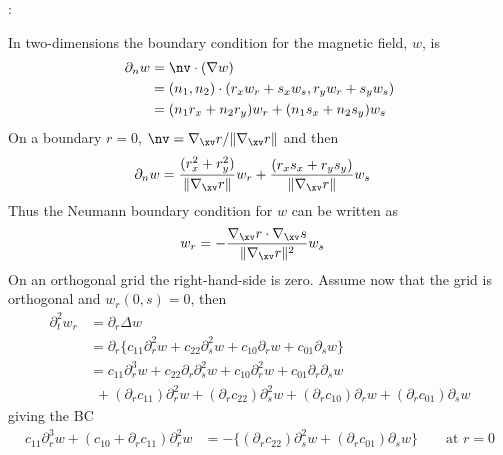 \documentclass[10pt]{article}
\newcommand{\grad}{\nabla}
\begin{document}
:

In two-dimensions the boundary condition for the magnetic field, $w$, is
\begin{align*}
    \partial_n w & = \nv\cdot(\grad w) \\
                 & = (n_1,n_2)\cdot(r_x w_r + s_x w_s, r_y w_r + s_y w_s ) \\
                 & = (n_1 r_x + n_2 r_y ) w_r + (n_1 s_x + n_2 s_y ) w_s 
\end{align*}
On a boundary $r=0$, $\nv=\grad_\xv r/\| \grad_\xv r \|$ and then
\begin{align*}
  \partial_n w & = {(r_x^2 + r_y^2) \over \| \grad_\xv r \|} w_r + {(r_x s_x + r_y s_y )\over \| \grad_\xv r \|}  w_s 
\end{align*}
Thus the Neumann boundary condition for $w$ can be written as 
\begin{align*}
  w_r &= - {\grad_\xv r\cdot\grad_\xv s \over   \| \grad_\xv r \|^2 } w_s 
\end{align*}
On an orthogonal grid the right-hand-side is zero.
Assume now that the grid is orthogonal and $w_r(0,s)=0$, then 
\begin{align*}
  \partial_t^2 w_r &= \partial_r\Delta w \\
   &= \partial_r\big\{ c_{11} \partial_r^2 w+ c_{22}\partial_s^2 w+ c_{10} \partial_r w+ c_{01} \partial_s w\big\}\\
   &= c_{11} \partial_r^3 w+ c_{22}\partial_r\partial_s^2 w+ c_{10} \partial_r^2 w+ c_{01} \partial_r\partial_s w \\
   &~~+ (\partial_r c_{11}) \partial_r^2 w+ (\partial_r c_{22})\partial_s^2 w
      + (\partial_r c_{10}) \partial_r w+ (\partial_r c_{01}) \partial_s w
\end{align*}
giving the BC
\begin{align*}
c_{11} \partial_r^3 w + (c_{10}+\partial_r c_{11})\partial_r^2 w &=
   -\big\{ (\partial_r c_{22})\partial_s^2 w + (\partial_r c_{01}) \partial_s w \big\} \qquad\mbox{at $r=0$}
\end{align*}
\end{document}
